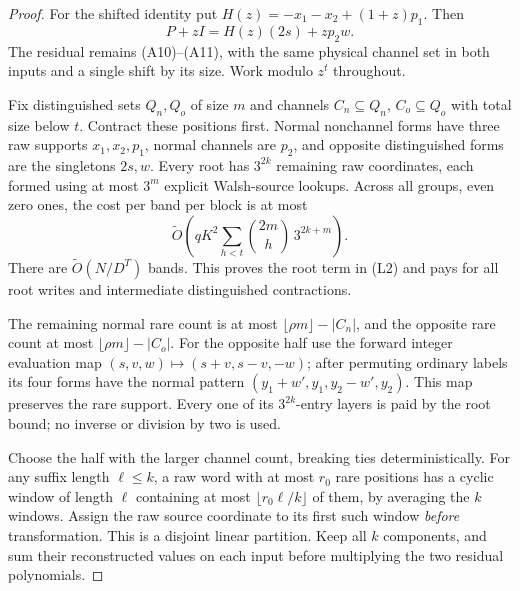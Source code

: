 \documentclass[11pt]{article}
\newcommand{\softO}{\widetilde O}
\begin{document}
\begin{proof}
For the shifted identity put
$H(z)=-x_1-x_2+(1+z)p_1$. Then
\[
 P+zI=H(z)(2s)+zp_2w.
\]
The residual remains (A10)--(A11), with the same physical channel
set in both inputs and a single shift by its size. Work modulo
$z^t$ throughout.

Fix distinguished sets $Q_n,Q_o$ of size $m$ and channels
$C_n\subseteq Q_n$, $C_o\subseteq Q_o$ with total size below $t$.
Contract these positions first. Normal nonchannel forms have three
raw supports $x_1,x_2,p_1$, normal channels are $p_2$, and opposite
distinguished forms are the singletons $2s,w$. Every root has
$3^{2k}$ remaining raw coordinates, each formed using at most $3^m$
explicit Walsh-source lookups. Across all groups, even zero ones,
the cost per band per block is at most
\[
 \softO\left(qK^2
       \sum_{h<t}\binom{2m}{h}\,3^{2k+m}\right).
\]
There are $\softO(N/D^T)$ bands. This proves the root term in (L2)
and pays for all root writes and intermediate distinguished
contractions.

The remaining normal rare count is at most
$\lfloor\rho m\rfloor-|C_n|$, and the opposite rare count at most
$\lfloor\rho m\rfloor-|C_o|$. For the opposite half use the forward
integer evaluation map $(s,v,w)\mapsto(s+v,s-v,-w)$; after permuting
ordinary labels its four forms have the normal pattern
$(y_1+w',y_1,y_2-w',y_2)$. This map preserves the rare support.
Every one of its $3^{2k}$-entry layers is paid by the root bound;
no inverse or division by two is used.

Choose the half with the larger channel count, breaking ties
deterministically. For any suffix length $\ell\le k$, a raw word
with at most $r_0$ rare positions has a cyclic window of length
$\ell$ containing at most $\lfloor r_0\ell/k\rfloor$ of them,
by averaging the $k$ windows. Assign the raw source coordinate to
its first such window \emph{before} transformation. This is a
disjoint linear partition. Keep all $k$ components, and sum their
reconstructed values on each input before multiplying the two
residual polynomials.


\end{proof}
\end{document}
